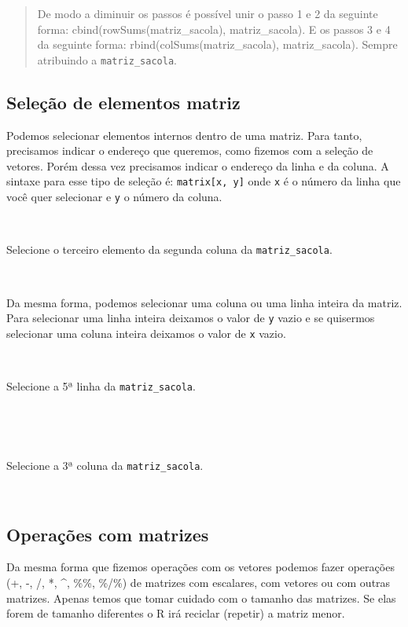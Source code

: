 \documentclass[]{book}
\theoremstyle{definition}
\theoremstyle{definition}
\theoremstyle{definition}
\theoremstyle{remark}
\let\BeginKnitrBlock\begin \let\EndKnitrBlock\end
\begin{document}
\begin{quote}
De modo a diminuir os passos é possível unir o passo 1 e 2 da seguinte forma: cbind(rowSums(matriz\_sacola), matriz\_sacola). E os passos 3 e 4 da seguinte forma: rbind(colSums(matriz\_sacola), matriz\_sacola). Sempre atribuindo a \texttt{matriz\_sacola}.
\end{quote}

\hypertarget{seleuxe7uxe3o-de-elementos-matriz}{%
\subsection{Seleção de elementos matriz}\label{seleuxe7uxe3o-de-elementos-matriz}}

Podemos selecionar elementos internos dentro de uma matriz. Para tanto, precisamos indicar o endereço que queremos, como fizemos com a seleção de vetores. Porém dessa vez precisamos indicar o endereço da linha e da coluna. A sintaxe para esse tipo de seleção é: \texttt{matrix{[}x,\ y{]}} onde \texttt{x} é o número da linha que você quer selecionar e \texttt{y} o número da coluna.

~
\BeginKnitrBlock{exercise}
\protect\hypertarget{exr:unnamed-chunk-61}{}{\label{exr:unnamed-chunk-61} }Selecione o terceiro elemento da segunda coluna da \texttt{matriz\_sacola}.
\EndKnitrBlock{exercise}

~

Da mesma forma, podemos selecionar uma coluna ou uma linha inteira da matriz. Para selecionar uma linha inteira deixamos o valor de \texttt{y} vazio e se quisermos selecionar uma coluna inteira deixamos o valor de \texttt{x} vazio.

~
\BeginKnitrBlock{exercise}
\protect\hypertarget{exr:unnamed-chunk-62}{}{\label{exr:unnamed-chunk-62} }Selecione a 5ª linha da \texttt{matriz\_sacola}.
\EndKnitrBlock{exercise}

~

~
\BeginKnitrBlock{exercise}
\protect\hypertarget{exr:unnamed-chunk-63}{}{\label{exr:unnamed-chunk-63} }Selecione a 3ª coluna da \texttt{matriz\_sacola}.
\EndKnitrBlock{exercise}

~

\hypertarget{operauxe7uxf5es-com-matrizes}{%
\subsection{Operações com matrizes}\label{operauxe7uxf5es-com-matrizes}}

Da mesma forma que fizemos operações com os vetores podemos fazer operações (+, -, /, *, \^{}, \%\%, \%/\%) de matrizes com escalares, com vetores ou com outras matrizes. Apenas temos que tomar cuidado com o tamanho das matrizes. Se elas forem de tamanho diferentes o R irá reciclar (repetir) a matriz menor.
\end{document}
